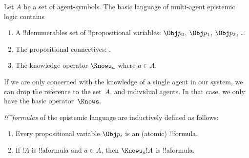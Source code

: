 \documentclass[../../../include/open-logic-section]{subfiles}
\begin{document}


\begin{defn}
Let $A$ be a set of agent-symbols. The basic language of multi-agent epistemic logic contains
\begin{enumerate}
  \item A !!{denumerable}s set of !!{propositional variable}s: $\Obj
    p_0$, $\Obj p_1$, $\Obj p_2$, \dots
  \item The propositional connectives: \startycommalist
  .
  \item The knowledge operator $\Knows_a$ where $a \in A$.
\end{enumerate}
\end{defn}

If we are only concerned with the knowledge of a single agent in our
system, we can drop the reference to the set~$A$, and individual
agents. In that case, we only have the basic operator~$\Knows$.

\begin{defn}
\emph{!!^{formula}s} of the epistemic language are inductively
  defined as follows:
\begin{enumerate}


\item Every propositional variable $\Obj p_i$ is an (atomic) !!{formula}.






\item If $!A$ is !!a{formula} and $a \in A$, then $\Knows_a !A$ is
  !!a{formula}.

\end{enumerate}
\end{defn}
\end{document}

